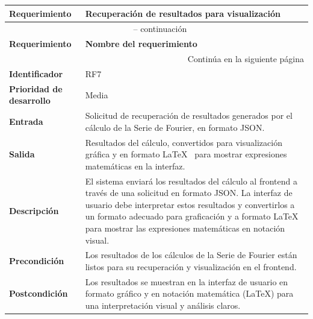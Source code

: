 \begin{longtable}{|m{3.5cm}|m{9.5cm}|}
	\hline
	\rowcolor{black!75} \color{white}\textbf{Requerimiento} & \color{white}\textbf{Recuperación de resultados para visualización} \\
	\hline
	\endfirsthead
	\multicolumn{2}{c}{{\tablename\ \thetable{} -- continuación}} \\
	\hline
	\rowcolor{black!75} \color{white}\textbf{Requerimiento} & \color{white}\textbf{Nombre del requerimiento} \\
	\hline
	\endhead
	\hline \multicolumn{2}{r}{{Continúa en la siguiente página}} \\
	\endfoot
	\hline
	\endlastfoot
	
	\textbf{Identificador} & RF7 \\
	\hline
	\textbf{Prioridad de desarrollo} & Media \\
	\hline
	\textbf{Entrada} & Solicitud de recuperación de resultados generados por el cálculo de la Serie de Fourier, en formato JSON. \\
	\hline
	\textbf{Salida} & Resultados del cálculo, convertidos para visualización gráfica y en formato \LaTeX~ para mostrar expresiones matemáticas en la interfaz. \\
	\hline
	\textbf{Descripción} & El sistema enviará los resultados del cálculo al frontend a través de una solicitud en formato JSON. La interfaz de usuario debe interpretar estos resultados y convertirlos a un formato adecuado para graficación y a formato \LaTeX~ para mostrar las expresiones matemáticas en notación visual. \\
	\hline
	\textbf{Precondición} & Los resultados de los cálculos de la Serie de Fourier están listos para su recuperación y visualización en el frontend. \\
	\hline
	\textbf{Postcondición} & Los resultados se muestran en la interfaz de usuario en formato gráfico y en notación matemática (\LaTeX) para una interpretación visual y análisis claros. \\
	\hline
\end{longtable}
\caption{Requerimiento funcional No. 7} \label{tabla:RF7}
\vspace{0.5cm}

